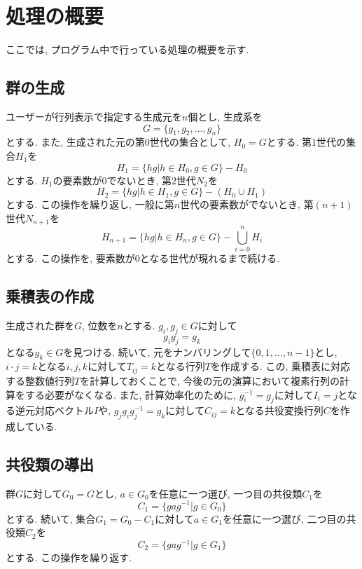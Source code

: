 \documentclass[11pt, a4paper]{jsarticle}
\begin{document}
\newpage
\section{処理の概要}
ここでは, プログラム中で行っている処理の概要を示す.

\subsection{群の生成}
ユーザーが行列表示で指定する生成元を$n$個とし, 生成系を
\begin{equation}
	G = \{g_1, g_2, \dots, g_n \}
\end{equation}
とする.
また, 生成された元の第0世代の集合として, $H_0=G$とする.
第1世代の集合$H_1$を
\begin{equation}
	H_1 = \{ hg | h \in H_0, g \in G\} - H_0
\end{equation}
とする.
$H_1$の要素数が0でないとき, 第2世代$N_2$を
\begin{equation}
	H_2 = \{ hg | h \in H_1, g \in G\} - (H_0 \cup H_1)
\end{equation}
とする.
この操作を繰り返し, 一般に第$n$世代の要素数がでないとき, 第$(n+1)$世代$N_{n+1}$を
\begin{equation}
	H_{n+1} = \{ hg | h \in H_n, g \in G\} - \bigcup_{i=0}^n H_i
\end{equation}
とする.
この操作を, 要素数が0となる世代が現れるまで続ける.

\subsection{乗積表の作成}
生成された群を$G$, 位数を$n$とする.
$g_i,g_j \in G$に対して
\begin{equation}
	g_i g_j = g_k
\end{equation}
となる$g_k \in G$を見つける.
続いて, 元をナンバリングして$\{0,1,\dots,n-1\}$とし, $i \cdot j = k$となる$i,j,k$に対して$T_{ij}=k$となる行列$T$を作成する.
この, 乗積表に対応する整数値行列$T$を計算しておくことで, 今後の元の演算において複素行列の計算をする必要がなくなる.
また, 計算効率化のために, $g_i^{-1}=g_j$に対して$I_i = j$となる逆元対応ベクトル$I$や, $g_jg_ig_j^{-1}=g_k$に対して$C_{ij}=k$となる共役変換行列$C$を作成している.

\subsection{共役類の導出}
群$G$に対して$G_0 = G$とし, $a \in G_0$を任意に一つ選び, 一つ目の共役類$C_1$を
\begin{equation}
	C_1 = \{ g a g^{-1} | g \in G_0\}
\end{equation}
とする.
続いて, 集合$G_1=G_0-C_1$に対して$a \in G_1$を任意に一つ選び, 二つ目の共役類$C_2$を
\begin{equation}
	C_2 = \{ g a g^{-1} | g \in G_1\}
\end{equation}
とする.
この操作を繰り返す.
\end{document}
